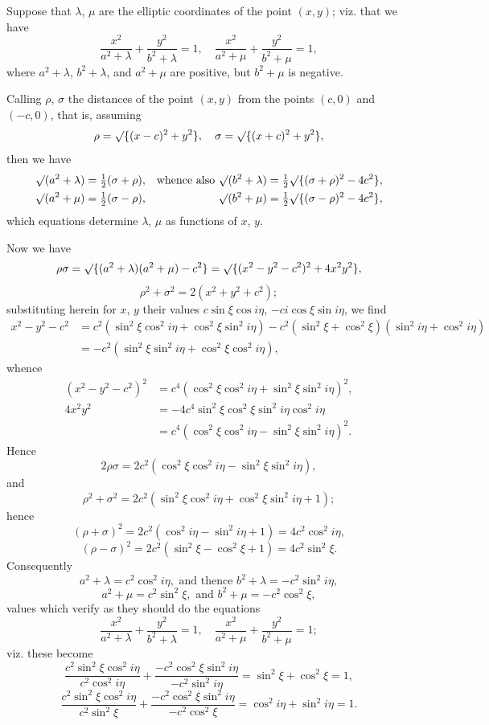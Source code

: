 \documentclass[11pt,a4paper]{book}
\begin{document}
Suppose that $\lambda$, $\mu$ are the elliptic coordinates of the point $(x, y)$; viz. that we have
\[
\frac{x^2}{a^2 + \lambda} + \frac{y^2}{b^2 + \lambda} = 1, \quad \frac{x^2}{a^2 + \mu} + \frac{y^2}{b^2 + \mu} = 1,
\]
where $a^2 + \lambda$, $b^2 + \lambda$, and $a^2 + \mu$ are positive, but $b^2 + \mu$ is negative.

Calling $\rho$, $\sigma$ the distances of the point $(x, y)$ from the points $(c, 0)$ and $(-c, 0)$, that is, assuming
\[
\rho = \surd\{(x - c)^2 + y^2\}, \quad \sigma = \surd\{(x + c)^2 + y^2\},
\]
then we have
\begin{align*}
\surd(a^2 + \lambda) &= \tfrac{1}{2}(\sigma + \rho), & \text{whence also } \surd(b^2 + \lambda) &= \tfrac{1}{2} \surd\{(\sigma + \rho)^2 - 4c^2\}, \\
\surd(a^2 + \mu) &= \tfrac{1}{2}(\sigma - \rho), & \surd(b^2 + \mu) &= \tfrac{1}{2} \surd\{(\sigma - \rho)^2 - 4c^2\},
\end{align*}
which equations determine $\lambda$, $\mu$ as functions of $x$, $y$.

Now we have
\[
\rho\sigma = \surd\{(a^2 + \lambda)(a^2 + \mu) - c^2\} = \surd\{(x^2 - y^2 - c^2)^2 + 4x^2y^2\},
\]
\[
\rho^2 + \sigma^2 = 2(x^2 + y^2 + c^2);
\]
substituting herein for $x$, $y$ their values $c \sin \xi \cos i\eta$, $-ci \cos \xi \sin i\eta$, we find
\begin{align*}
x^2 - y^2 - c^2 &= c^2(\sin^2 \xi \cos^2 i\eta + \cos^2 \xi \sin^2 i\eta) - c^2(\sin^2 \xi + \cos^2 \xi)(\sin^2 i\eta + \cos^2 i\eta) \\
&= -c^2(\sin^2 \xi \sin^2 i\eta + \cos^2 \xi \cos^2 i\eta),
\end{align*}
whence
\begin{align*}
(x^2 - y^2 - c^2)^2 &= c^4(\cos^2 \xi \cos^2 i\eta + \sin^2 \xi \sin^2 i\eta)^2, \\
4x^2y^2 &= -4c^4 \sin^2 \xi \cos^2 \xi \sin^2 i\eta \cos^2 i\eta \\
&= c^4(\cos^2 \xi \cos^2 i\eta - \sin^2 \xi \sin^2 i\eta)^2.
\end{align*}
Hence
\[
2\rho\sigma = 2c^2(\cos^2 \xi \cos^2 i\eta - \sin^2 \xi \sin^2 i\eta),
\]
and
\[
\rho^2 + \sigma^2 = 2c^2(\sin^2 \xi \cos^2 i\eta + \cos^2 \xi \sin^2 i\eta + 1);
\]
hence
\[
(\rho + \sigma)^2 = 2c^2(\cos^2 i\eta - \sin^2 i\eta + 1) = 4c^2 \cos^2 i\eta,
\]
\[
(\rho - \sigma)^2 = 2c^2(\sin^2 \xi - \cos^2 \xi + 1) = 4c^2 \sin^2 \xi.
\]
Consequently
\[
a^2 + \lambda = c^2 \cos^2 i\eta, \text{ and thence } b^2 + \lambda = -c^2 \sin^2 i\eta,
\]
\[
a^2 + \mu = c^2 \sin^2 \xi, \text{ and } b^2 + \mu = -c^2 \cos^2 \xi,
\]
values which verify as they should do the equations
\[
\frac{x^2}{a^2 + \lambda} + \frac{y^2}{b^2 + \lambda} = 1, \quad \frac{x^2}{a^2 + \mu} + \frac{y^2}{b^2 + \mu} = 1;
\]
viz. these become
\[
\frac{c^2 \sin^2 \xi \cos^2 i\eta}{c^2 \cos^2 i\eta} + \frac{-c^2 \cos^2 \xi \sin^2 i\eta}{-c^2 \sin^2 i\eta} = \sin^2 \xi + \cos^2 \xi = 1,
\]
\[
\frac{c^2 \sin^2 \xi \cos^2 i\eta}{c^2 \sin^2 \xi} + \frac{-c^2 \cos^2 \xi \sin^2 i\eta}{-c^2 \cos^2 \xi} = \cos^2 i\eta + \sin^2 i\eta = 1.
\]
\end{document}
